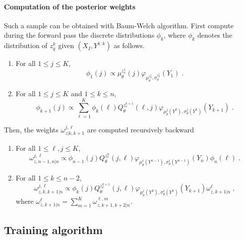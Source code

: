\documentclass{article}
\newcommand{\eqsp}{\;}
\newcommand{\rme}{\mathrm{e}}
\begin{document}
%

\paragraph{Computation of the posterior weights}
Such a sample can be obtained with Baum-Welch algorithm.
First compute during the forward pass the discrete distributions $\phi_k$, where $\phi_k$ denotes the distribution of $z_q^k$ given $(X_I,Y^{1:k})$ as follows.
\begin{enumerate}
\item For all $1\leqslant j \leqslant K$,
$$
\phi_1(j) \propto \mu^{z_\rme^1}_{\theta}(j) \varphi_{\mu^{z_q^{1}}_\theta,\sigma^{z_q^{1}}_\theta}(Y_1)\eqsp.
$$
\item For all $1\leqslant j \leqslant K$ and  $1\leqslant k \leqslant n$,
$$
\phi_{k+1}(j) \propto \sum_{\ell=1}^K \phi_{k}(\ell)  Q^{z_\rme^{k+1}}_{\theta}(\ell,j) \varphi_{\mu^{j}_\theta (Y^{k}),\sigma^{j}_\theta(Y^{k})}(Y_{k+1})\eqsp.
$$
\end{enumerate}
Then, the weights $ \omega^{j,\ell}_{z|k,k+1}$ are computed recursively backward
\begin{enumerate}
\item For all $1\leqslant \ell,j \leqslant K$,
$$
\omega^{j,\ell}_{z,n-1,n|n} \propto \phi_{n-1}(j)Q^{z_\rme^{n}}_{\theta}(j,\ell) \varphi_{\mu^{\ell}_\theta(Y^{n-1}),\sigma^{\ell}_\theta(Y^{n-1})}(Y_{n})\phi_{n}(\ell)   \eqsp.
$$
\item For all  $1\leqslant k \leqslant n-2$,
$$
\omega^{j,\ell}_{z,k,k+1|n} \propto \phi_{k}(j)Q^{z_\rme^{k+1}}_{\theta}(j,\ell) \varphi_{\mu^{\ell}_\theta(Y^{k}),\sigma^{\ell}_\theta(Y^{k})}(Y_{k+1})\omega^{\ell}_{z,k+1|n}  \eqsp,
$$
where $\omega^{\ell}_{z,k+1|n} = \sum_{m=1}^K\omega^{\ell,m}_{z,k+1,k+2|n}$.
\end{enumerate}

\subsection{Training algorithm}
\end{document}
